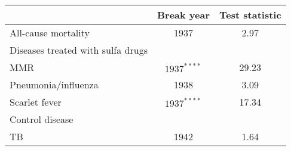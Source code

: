 \begin{tabular}{lcc}
\hline & Break year & Test statistic \\
\hline All-cause mortality & 1937 & 2.97 \\
Diseases treated with sulfa drugs & & \\
MMR & $1937^{* * * *}$ & 29.23 \\
Pneumonia/influenza & 1938 & 3.09 \\
Scarlet fever & $1937^{* * * *}$ & 17.34 \\
Control disease & & \\
TB & 1942 & 1.64 \\
\hline
\end{tabular}